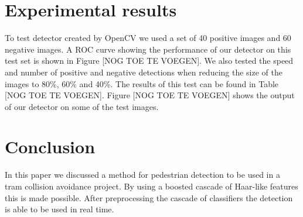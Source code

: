 \documentclass{article}
\begin{document}
\section{Experimental results}
To test detector created by OpenCV we used a set of 40 positive images and 60 negative images. A ROC curve showing the performance of our detector on this test set is shown in Figure [NOG TOE TE VOEGEN]. We also tested the speed and number of positive and negative detections when reducing the size of the images to 80\%, 60\% and 40\%. The results of this test can be found in Table [NOG TOE TE VOEGEN]. Figure [NOG TOE TE VOEGEN] shows the output of our detector on some of the test images.

\section{Conclusion}
In this paper we discussed a method for pedestrian detection to be used in a tram collision avoidance project. By using a boosted cascade of Haar-like features this is made possible. After preprocessing the cascade of classifiers the detection is able to be used in real time.



\end{document}

